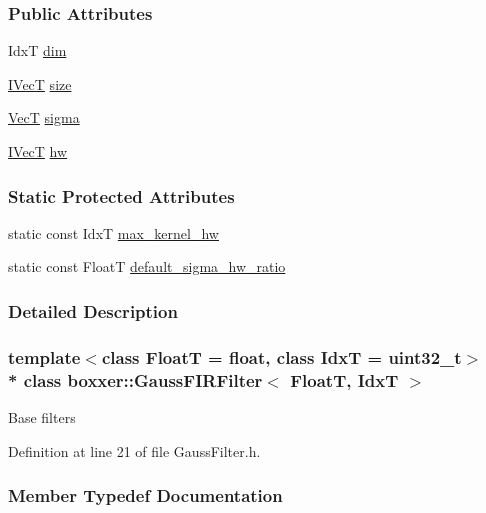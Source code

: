 \subsubsection*{Public Attributes}
\begin{DoxyCompactItemize}
\item 
IdxT \hyperlink{classboxxer_1_1GaussFIRFilter_ac7adcd4d8f8efee00a65262f596c8eda}{dim}
\item 
\hyperlink{classboxxer_1_1GaussFIRFilter_a0083c8c9ab6032dd458b4dc93852c2b8}{I\+VecT} \hyperlink{classboxxer_1_1GaussFIRFilter_ac0d4e19bb2be3e8913e77283e7e4317e}{size}
\item 
\hyperlink{classboxxer_1_1GaussFIRFilter_aafe2049df690ad8c3617c39810e78bbe}{VecT} \hyperlink{classboxxer_1_1GaussFIRFilter_a66ced06c688fd544d5f1f8be39aa2125}{sigma}
\item 
\hyperlink{classboxxer_1_1GaussFIRFilter_a0083c8c9ab6032dd458b4dc93852c2b8}{I\+VecT} \hyperlink{classboxxer_1_1GaussFIRFilter_ae17a4e137303e452a9223ba34825e0da}{hw}
\end{DoxyCompactItemize}
\subsubsection*{Static Protected Attributes}
\begin{DoxyCompactItemize}
\item 
static const IdxT \hyperlink{classboxxer_1_1GaussFIRFilter_a7f85e018f78753ee4fedf65c04b0c65a}{max\+\_\+kernel\+\_\+hw}
\item 
static const FloatT \hyperlink{classboxxer_1_1GaussFIRFilter_a72b51cd7549510735179cb9c94f5f43f}{default\+\_\+sigma\+\_\+hw\+\_\+ratio}
\end{DoxyCompactItemize}


\subsubsection{Detailed Description}
\subsubsection*{template$<$class FloatT = float, class IdxT = uint32\+\_\+t$>$\\*
class boxxer\+::\+Gauss\+F\+I\+R\+Filter$<$ Float\+T, Idx\+T $>$}

Base filters 

Definition at line 21 of file Gauss\+Filter.\+h.



\subsubsection{Member Typedef Documentation}
